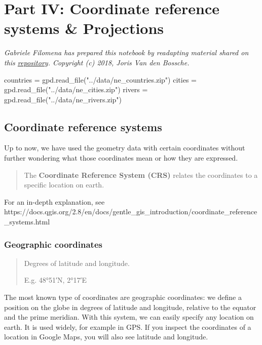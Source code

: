 \documentclass[
  letterpaper,
  DIV=11,
  numbers=noendperiod]{scrreprt}
\newenvironment{Shaded}{\begin{snugshade}}{\end{snugshade}}
\newcommand{\NormalTok}[1]{\textcolor[rgb]{0.00,0.23,0.31}{#1}}
\newcommand{\OperatorTok}[1]{\textcolor[rgb]{0.37,0.37,0.37}{#1}}
\newcommand{\StringTok}[1]{\textcolor[rgb]{0.13,0.47,0.30}{#1}}
\begin{document}
\section{Part IV: Coordinate reference systems \&
Projections}\label{part-iv-coordinate-reference-systems-projections}

\emph{Gabriele Filomena has prepared this notebook by readapting
material shared on this
\href{https://github.com/jorisvandenbossche/geopandas-tutorial}{repository}.
Copyright (c) 2018, Joris Van den Bossche.}

\begin{Shaded}
\begin{Highlighting}[]
\NormalTok{countries }\OperatorTok{=}\NormalTok{ gpd.read\_file(}\StringTok{"../data/ne\_countries.zip"}\NormalTok{)}
\NormalTok{cities }\OperatorTok{=}\NormalTok{ gpd.read\_file(}\StringTok{"../data/ne\_cities.zip"}\NormalTok{)}
\NormalTok{rivers }\OperatorTok{=}\NormalTok{ gpd.read\_file(}\StringTok{"../data/ne\_rivers.zip"}\NormalTok{)}
\end{Highlighting}
\end{Shaded}

\subsection{Coordinate reference
systems}\label{coordinate-reference-systems}

Up to now, we have used the geometry data with certain coordinates
without further wondering what those coordinates mean or how they are
expressed.

\begin{quote}
The \textbf{Coordinate Reference System (CRS)} relates the coordinates
to a specific location on earth.
\end{quote}

For an in-depth explanation, see
https://docs.qgis.org/2.8/en/docs/gentle\_gis\_introduction/coordinate\_reference\_systems.html

\subsubsection{Geographic coordinates}\label{geographic-coordinates}

\begin{quote}
Degrees of latitude and longitude.

E.g. 48°51′N, 2°17′E
\end{quote}

The most known type of coordinates are geographic coordinates: we define
a position on the globe in degrees of latitude and longitude, relative
to the equator and the prime meridian. With this system, we can easily
specify any location on earth. It is used widely, for example in GPS. If
you inspect the coordinates of a location in Google Maps, you will also
see latitude and longitude.
\end{document}
